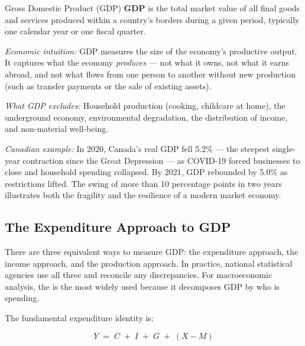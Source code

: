\begin{defbox}{Gross Domestic Product (GDP)}
\textbf{GDP} is the total market value of all final goods and services
produced within a country's borders during a given period, typically one
calendar year or one fiscal quarter.

\textit{Economic intuition:} GDP measures the size of the economy's
productive output. It captures what the economy \textit{produces} --- not
what it owns, not what it earns abroad, and not what flows from one
person to another without new production (such as transfer payments or
the sale of existing assets).

\textit{What GDP excludes:} Household production (cooking, childcare at
home), the underground economy, environmental degradation, the distribution
of income, and non-material well-being.

\textit{Canadian example:} In 2020, Canada's real GDP fell 5.2\% ---
the steepest single-year contraction since the Great Depression --- as
COVID-19 forced businesses to close and household spending collapsed.
By 2021, GDP rebounded by 5.0\% as restrictions lifted. The swing of
more than 10 percentage points in two years illustrates both the fragility
and the resilience of a modern market economy.
\end{defbox}

\subsection{The Expenditure Approach to GDP}
\label{sec:expenditure}

There are three equivalent ways to measure GDP: the expenditure approach,
the income approach, and the production approach. In practice, national
statistical agencies use all three and reconcile any discrepancies.
For macroeconomic analysis, the  is the most
widely used because it decomposes GDP by who is spending.

The fundamental expenditure identity is:

\begin{equation}
  Y \;=\; C \;+\; I \;+\; G \;+\; (X - M)
  \label{eq:gdp_expenditure}
\end{equation}

